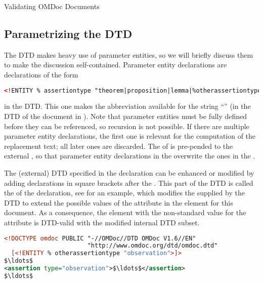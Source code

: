 \begin{module}[id=validating]
\begin{omgroup}[id=validating]{Validating OMDoc Documents}
\subsection{Parametrizing the DTD}\label{subsec:parameter-entities}
The {\omdoc} DTD makes heavy use of parameter entities, so we will briefly discuss them to
make the discussion self-contained. Parameter entity declarations are declarations of the
form
\begin{center}
\begin{lstlisting}[language=XML,index={ENTITY}]
<!ENTITY % assertiontype "theorem|proposition|lemma|%otherassertiontype;">
\end{lstlisting}
\end{center}
in the DTD. This one makes the abbreviation {} available for the
string ``'' (in the DTD of the document in
{}). Note that parameter entities must be fully defined before they can
be referenced, so recursion is not possible. If there
are multiple parameter entity declarations, the first one is relevant for the computation
of the replacement text; all later ones are discarded. The {} of
{} is pre-pended to the external {}, so
that parameter entity declarations in the {} overwrite the ones
in the {}.

The (external) DTD specified in the {} declaration can be enhanced or
modified by adding declarations in square brackets after the {}
{}. This part of the DTD is called the
{} of the {}
declaration, see {} for an example, which modifies the
{} {} supplied by the {\omdoc}
DTD to extend the possible values of the {} attribute in the
{} element for this document. As a consequence, the
{} element with the non-standard value for the
{} attribute is DTD-valid with the modified internal DTD
subset.

\begin{lstlisting}[label=lst:internal,language=XML,morekeywords={omdoc},mathescape,
  caption={A Document Type Declaration with Internal Subset},
  index={DOCTYPE,ENTITY,ELEMENT,ATTLIST,omdoc,PUBLIC}]
<!DOCTYPE omdoc PUBLIC "-//OMDoc//DTD OMDoc V1.6//EN"
                       "http://www.omdoc.org/dtd/omdoc.dtd" 
  [<!ENTITY % otherassertiontype "observation">]>
$\ldots$
<assertion type="observation">$\ldots$</assertion>
$\ldots$
\end{lstlisting}



\end{omgroup}
\end{module}
